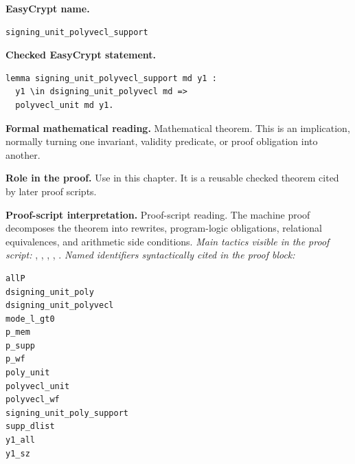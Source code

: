 \begin{formaltheorem}
\noindent\textbf{EasyCrypt name.}
\begin{lstlisting}[language=EasyCrypt,basicstyle=\ttfamily\scriptsize]
signing_unit_polyvecl_support
\end{lstlisting}
\noindent\textbf{Checked EasyCrypt statement.}
\begin{lstlisting}[language=EasyCrypt,basicstyle=\ttfamily\scriptsize]
lemma signing_unit_polyvecl_support md y1 :
  y1 \in dsigning_unit_polyvecl md =>
  polyvecl_unit md y1.
\end{lstlisting}
\noindent\textbf{Formal mathematical reading.}
Mathematical theorem. This is an implication, normally turning one invariant, validity predicate, or proof obligation into another.

\noindent\textbf{Role in the proof.}
Use in this chapter. It is a reusable checked theorem cited by later proof scripts.

\noindent\textbf{Proof-script interpretation.}
Proof-script reading. The machine proof decomposes the theorem into rewrites, program-logic obligations, relational equivalences, and arithmetic side conditions.
\emph{Main tactics visible in the proof script:} , , , , .
\emph{Named identifiers syntactically cited in the proof block:}
\begin{lstlisting}[language=EasyCrypt,basicstyle=\ttfamily\scriptsize]
allP
dsigning_unit_poly
dsigning_unit_polyvecl
mode_l_gt0
p_mem
p_supp
p_wf
poly_unit
polyvecl_unit
polyvecl_wf
signing_unit_poly_support
supp_dlist
y1_all
y1_sz
\end{lstlisting}

\end{formaltheorem}

